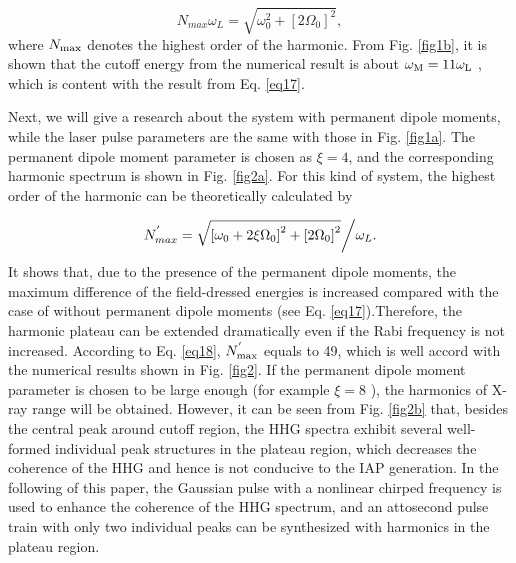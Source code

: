 \documentclass[10pt,letterpaper]{article}
\begin{document}
\begin{equation}
{N_{max }}{\omega _L} = \sqrt {\omega _0^2 + {{\left[ {2{\Omega _0}} \right]}^2}} ,
\label{eq17}
\end{equation}
where $ N_{\rm{max}} $ denotes the highest order of the harmonic. From Fig. \ref{fig1b}, it is shown that the cutoff energy from the numerical result is about $ \omega_{\rm{M}}=11\omega_{\rm{L}} $ , which is content with the result from Eq. \ref{eq17}.

Next, we will give a research about the system with permanent dipole moments, while the laser pulse parameters are the same with those in Fig. \ref{fig1a}. The permanent dipole moment parameter is chosen as $ \xi=4 $, and the corresponding harmonic spectrum is shown in Fig. \ref{fig2a}. For this kind of system, the highest order of the harmonic can be theoretically calculated by

\begin{equation}
N_{max }^{'} = {{\sqrt {{{\left[ {{\omega _0} + 2\xi {\Omega _0}} \right]}^2} + {{\left[ {2{\Omega _0}} \right]}^2}} } \mathord{\left/
		{\vphantom {{\sqrt {{{\left[ {{\omega _0} + 2\xi {\Omega _0}} \right]}^2} + {{\left[ {2{\Omega _0}} \right]}^2}} } {{\omega _L}}}} \right.
		\kern-\nulldelimiterspace} {{\omega _L}}}.
\label{eq18}
\end{equation}
It shows that, due to the presence of the permanent dipole moments, the maximum difference of the field-dressed energies is increased compared with the case of without permanent dipole moments (see Eq. \ref{eq17}).Therefore, the harmonic plateau can be extended dramatically even if the Rabi frequency is not increased. According to Eq. \ref{eq18}, $ N_{\rm{max}}^{'}$ equals to 49, which is well accord with the numerical results shown in Fig. \ref{fig2}. If the permanent dipole moment parameter is chosen to be large enough (for example $ \xi=8 $ ), the harmonics of X-ray range will be obtained. However, it can be seen from Fig. \ref{fig2b} that, besides the central peak around cutoff region, the HHG spectra exhibit several well-formed individual peak structures in the plateau region, which decreases the coherence of the HHG and hence is not conducive to the IAP generation. In the following of this paper, the Gaussian pulse with a nonlinear chirped frequency is used to enhance the coherence of the HHG spectrum, and an attosecond pulse train with only two individual peaks can be synthesized with harmonics in the plateau region. 
\end{document}
